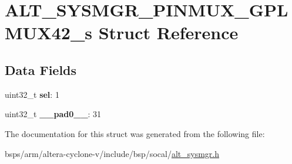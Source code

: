 \hypertarget{structALT__SYSMGR__PINMUX__GPLMUX42__s}{}\section{A\+L\+T\+\_\+\+S\+Y\+S\+M\+G\+R\+\_\+\+P\+I\+N\+M\+U\+X\+\_\+\+G\+P\+L\+M\+U\+X42\+\_\+s Struct Reference}
\label{structALT__SYSMGR__PINMUX__GPLMUX42__s}
\subsection*{Data Fields}
\begin{DoxyCompactItemize}
\item 
\mbox{\label{structALT__SYSMGR__PINMUX__GPLMUX42__s_adf04240981b0ab3b44ee6c1b6454c8b3}} 
uint32\+\_\+t {\bfseries sel}\+: 1
\item 
\mbox{\label{structALT__SYSMGR__PINMUX__GPLMUX42__s_ae92a707b6da7172b3e6610984f74bbeb}} 
uint32\+\_\+t {\bfseries \+\_\+\+\_\+pad0\+\_\+\+\_\+}\+: 31
\end{DoxyCompactItemize}


The documentation for this struct was generated from the following file\+:\begin{DoxyCompactItemize}
\item 
bsps/arm/altera-\/cyclone-\/v/include/bsp/socal/\mbox{\hyperlink{alt__sysmgr_8h}{alt\+\_\+sysmgr.\+h}}\end{DoxyCompactItemize}
